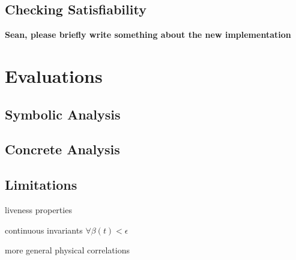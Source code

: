 \documentclass{sig-alternate}
\begin{document}
\subsection{Checking Satisfiability}

\textbf{Sean, please briefly write something about the new implementation}
\newpage



\section{Evaluations}

\subsection{Symbolic Analysis}

\subsection{Concrete Analysis}

\subsection{Limitations}

liveness properties

continuous invariants $\forall \beta(t) < \epsilon$

more general physical correlations









\end{document}
